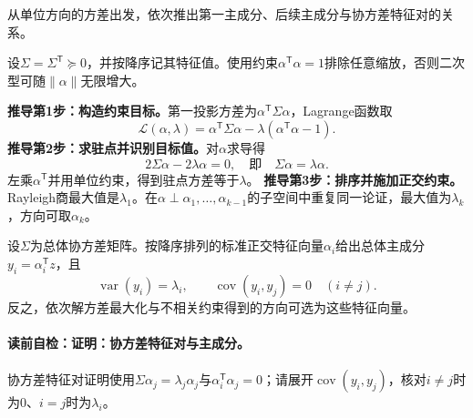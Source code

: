 \label{struct:V4-C04-CH11}

\begin{derivationgoalbox}
从单位方向的方差出发，依次推出第一主成分、后续主成分与协方差特征对的关系。
\end{derivationgoalbox}
\begin{derivationprepbox}
设$\Sigma=\Sigma^{\mathsf T}\succeq0$，并按降序记其特征值。使用约束$\alpha^{\mathsf T}\alpha=1$排除任意缩放，否则二次型可随$\|\alpha\|$无限增大。
\end{derivationprepbox}
\textbf{推导第1步：构造约束目标。}第一投影方差为$\alpha^{\mathsf T}\Sigma\alpha$，Lagrange函数取
\[
\mathcal L(\alpha,\lambda)=\alpha^{\mathsf T}\Sigma\alpha
-\lambda(\alpha^{\mathsf T}\alpha-1).
\]
\textbf{推导第2步：求驻点并识别目标值。}对$\alpha$求导得
\[
2\Sigma\alpha-2\lambda\alpha=0,
\quad\text{即}\quad \Sigma\alpha=\lambda\alpha.
\]
左乘$\alpha^{\mathsf T}$并用单位约束，得到驻点方差等于$\lambda$。
\textbf{推导第3步：排序并施加正交约束。}Rayleigh商最大值是$\lambda_1$。在$\alpha\perp\alpha_1,\ldots,\alpha_{k-1}$的子空间中重复同一论证，最大值为$\lambda_k$，方向可取$\alpha_k$。

\label{struct:V4-C04-CH12}
\begin{theorem}[协方差特征对与主成分]\label{thm:V4-C04-eigen-pc}
设$\Sigma$为总体协方差矩阵。按降序排列的标准正交特征向量$\alpha_i$给出总体主成分$y_i=\alpha_i^{\mathsf T}z$，且
\[
\operatorname{var}(y_i)=\lambda_i,\qquad
\operatorname{cov}(y_i,y_j)=0\quad(i\ne j).
\]
反之，依次解方差最大化与不相关约束得到的方向可选为这些特征向量。
\end{theorem}

\label{struct:V4-C04-CH13}
\paragraph{读前自检：证明：协方差特征对与主成分。}协方差特征对证明使用$\Sigma\alpha_j=\lambda_j\alpha_j$与$\alpha_i^{\mathsf T}\alpha_j=0$；请展开$\operatorname{cov}(y_i,y_j)$，核对$i\ne j$时为0、$i=j$时为$\lambda_i$。\par

